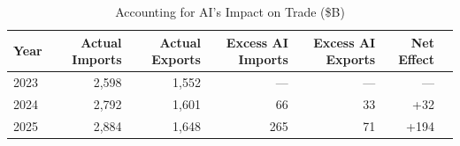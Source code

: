 \begin{table}[htbp]
\centering
\caption{Accounting for AI's Impact on Trade (\$B)}
\label{tab:counterfactual_summary}
\setlength{\tabcolsep}{1.75mm}
\renewcommand{\arraystretch}{1.60}
\begin{tabular}{lrrrrrr}
\toprule
Year & Actual Imports & Actual Exports & Excess AI Imports & Excess AI Exports & Net Effect \\
\midrule
2023 & 2,598 & 1,552 & --- & --- & --- \\
2024 & 2,792 & 1,601 & 66 & 33 & +32 \\
2025 & 2,884 & 1,648 & 265 & 71 & +194 \\
\bottomrule
\end{tabular}
\end{table}
